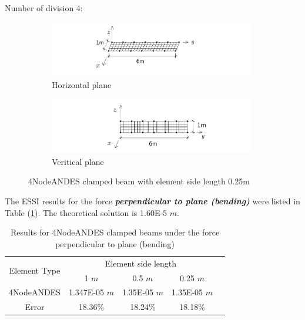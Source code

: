 \documentclass[fleqn,11pt]{article}
\begin{document}
Number of division 4:

\begin{figure}[H]
  \centering
    \begin{subfigure}{0.5\textwidth}
      \centering
      \includegraphics[width=9cm]{../Figure-files/beam_ANDES_xy_more.pdf}
      \caption{Horizontal plane}
    \end{subfigure}
    \begin{subfigure}{0.5\textwidth}
      \centering
      \includegraphics[width=9cm]{../Figure-files/beam_ANDES_yz_more.pdf}
      \caption{Veritical  plane}
    \end{subfigure}
  \caption{4NodeANDES clamped beam with element side length 0.25m }
  \label{fig 4NodeANDES clamped beams with element side length 0.25m}
\end{figure}





The ESSI results for the force \textbf{\emph{perpendicular to plane (bending)}} were listed in Table (\ref{table Results for 4NodeANDES clamped beams with more elements}).  
The theoretical solution is 1.60E-5 $m$. 

\begin{table}[H]
  \centering
    \caption{Results for 4NodeANDES clamped beams under the force perpendicular to plane (bending)}
  \label{table Results for 4NodeANDES clamped beams with more elements}
  \begin{tabular}{|c|c|c|c|c|}
    \hline 
    \multirow{2}{*}{Element Type} 
       & \multicolumn{3}{|c|}{Element side length} \\ \cline{2-4}
       & 1 $m$ & 0.5 $m$ & 0.25 $m$ \\                              \hline
4NodeANDES & 1.347E-05 $m$ & 1.35E-05  $m$& 1.35E-05 $m$  \\ \hline
Error      & 18.36\%   & 18.24\%  & 18.18\%       \\ \hline
  \end{tabular}
\end{table}
\end{document}
